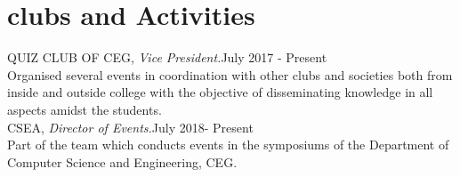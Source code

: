 \documentclass[a4paper,10pt]{article}
\begin{document}
\section{clubs and Activities}
QUIZ CLUB OF CEG, \emph{Vice President.}\hfill July 2017 - Present\\
Organised several events in coordination with other clubs and societies both from inside and outside college with the objective of disseminating knowledge in all aspects amidst the students.\\

CSEA, \emph{Director of Events.}\hfill July 2018- Present\\
Part of the team which conducts events in the symposiums of the Department of Computer Science and Engineering, CEG.
\end{document}
